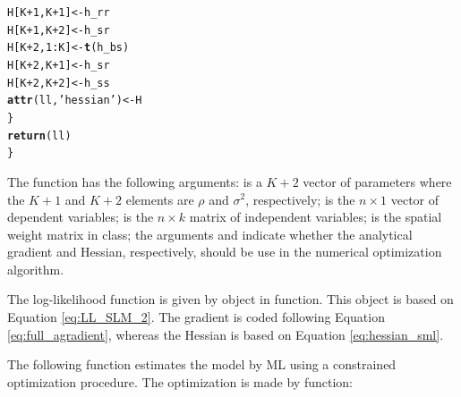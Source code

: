 \documentclass[english,12pt]{book}\usepackage[]{graphicx}\usepackage[]{xcolor}
\makeatletter
\newcommand{\hlnum}[1]{\textcolor[rgb]{0.686,0.059,0.569}{#1}}%
\newcommand{\hlstr}[1]{\textcolor[rgb]{0.192,0.494,0.8}{#1}}%
\newcommand{\hlopt}[1]{\textcolor[rgb]{0,0,0}{#1}}%
\newcommand{\hlstd}[1]{\textcolor[rgb]{0.345,0.345,0.345}{#1}}%
\newcommand{\hlkwb}[1]{\textcolor[rgb]{0.69,0.353,0.396}{#1}}%
\newcommand{\hlkwd}[1]{\textcolor[rgb]{0.737,0.353,0.396}{\textbf{#1}}}%
\newenvironment{kframe}{%
 \def\at@end@of@kframe{}%
 \ifinner\ifhmode%
  \def\at@end@of@kframe{\end{minipage}}%
  \begin{minipage}{\columnwidth}%
 \fi\fi%
 \def\FrameCommand##1{\hskip\@totalleftmargin \hskip-\fboxsep
 \colorbox{shadecolor}{##1}\hskip-\fboxsep
     \hskip-\linewidth \hskip-\@totalleftmargin \hskip\columnwidth}%
 \MakeFramed {\advance\hsize-\width
   \@totalleftmargin\z@ \linewidth\hsize
   \@setminipage}}%
 {\par\unskip\endMakeFramed%
 \at@end@of@kframe}
\newenvironment{knitrout}{}{} %
\makeatother
\begin{document}
\begin{knitrout}
\begin{kframe}
\begin{alltt}
    \hlstd{H[K} \hlopt{+} \hlnum{1}\hlstd{, K} \hlopt{+} \hlnum{1}\hlstd{]} \hlkwb{<-} \hlstd{h_rr}
    \hlstd{H[K} \hlopt{+} \hlnum{1}\hlstd{, K} \hlopt{+} \hlnum{2}\hlstd{]} \hlkwb{<-} \hlstd{h_sr}
    \hlstd{H[K} \hlopt{+} \hlnum{2}\hlstd{,} \hlnum{1}\hlopt{:}\hlstd{K]}   \hlkwb{<-} \hlkwd{t}\hlstd{(h_bs)}
    \hlstd{H[K} \hlopt{+} \hlnum{2}\hlstd{, K} \hlopt{+} \hlnum{1}\hlstd{]} \hlkwb{<-} \hlstd{h_sr}
    \hlstd{H[K} \hlopt{+} \hlnum{2}\hlstd{, K} \hlopt{+} \hlnum{2}\hlstd{]} \hlkwb{<-} \hlstd{h_ss}
    \hlkwd{attr}\hlstd{(ll,} \hlstr{'hessian'}\hlstd{)} \hlkwb{<-} \hlstd{H}
  \hlstd{\}}
  \hlkwd{return}\hlstd{(ll)}
\hlstd{\}}
\end{alltt}
\end{kframe}
\end{knitrout}

The function  has the following arguments:  is a $K + 2$ vector of parameters where the $K + 1$ and $K + 2$ elements are $\rho$ and $\sigma^2$, respectively;  is the $n\times 1$ vector of dependent variables;  is the $n\times k$ matrix of independent variables;  is the spatial weight matrix in  class; the arguments  and  indicate whether the analytical gradient and Hessian, respectively, should be use in the numerical optimization algorithm.

The log-likelihood function is given by object  in  function. This object is based on Equation \eqref{eq:LL_SLM_2}. The gradient is coded following Equation \eqref{eq:full_agradient}, whereas the Hessian is based on Equation \eqref{eq:hessian_sml}.

The following function estimates the model by ML using a constrained optimization procedure. The optimization is made by  function:
\end{document}
